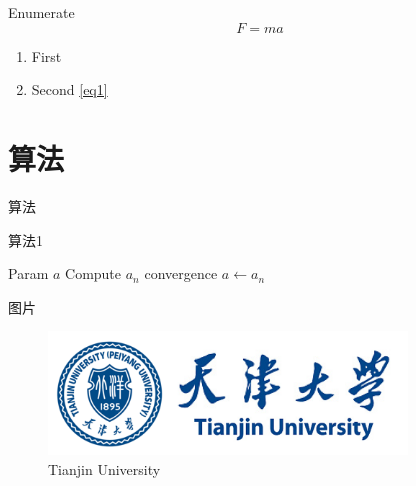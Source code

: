 \documentclass[hyperref,UTF8,11pt]{beamer}
\begin{document}
\begin{frame}{Enumerate}
    \begin{equation}
        F=ma\label{eq1}
    \end{equation}
    \begin{enumerate}
        \item First 
        \item Second \eqref{eq1}
    \end{enumerate}
\end{frame}

\section{算法}

\begin{frame}{算法}
    \begin{algorithm}[H]
        \caption{算法1}\label{alg:em}
        \begin{algorithmic}[1]
            \REQUIRE Param
            \ENSURE $a$
            \REPEAT
            \STATE Compute $a_n$
            \UNTIL convergence
            \RETURN $a\leftarrow a_n$
        \end{algorithmic}
    \end{algorithm}    
\end{frame}

\begin{frame}{图片}
    \begin{figure}
        \centering
        \includegraphics[width=0.85\textwidth]{tju_logo.png}
        \caption{Tianjin University}\label{fig:tju_logo}
    \end{figure}
\end{frame}
\end{document}
